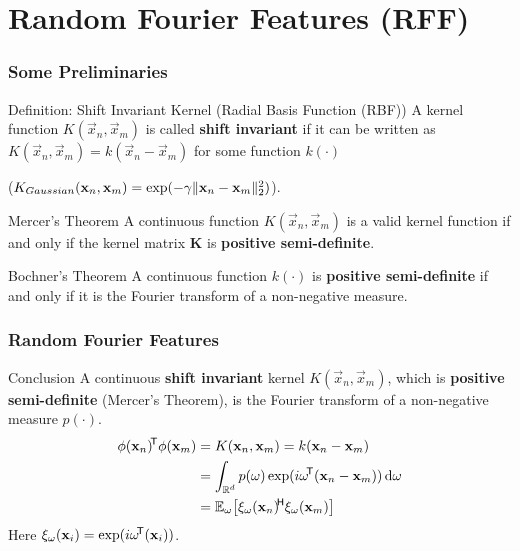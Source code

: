 \documentclass[10pt]{../Formats/RU}
\begin{document}
\section{Random Fourier Features (RFF)}
\begin{frame}
\frametitle{Some Preliminaries}
\begin{block}{Definition: Shift Invariant Kernel (Radial Basis Function (RBF))}
  A kernel function $K(\vec{x}_n, \vec{x}_m)$ is called \textbf{shift invariant} if it can be written as $K(\vec{x}_n, \vec{x}_m) = k(\vec{x}_n-\vec{x}_m)$ for some function $k(\cdot)$

  (\eg $K_{Gaussian}(\mathbf{x}_n,\mathbf{x}_m)=\exp(-\gamma\lVert\mathbf{x}_n-\mathbf{x}_m\rVert_2^2)$).
\end{block}
\begin{alertblock}{Mercer’s Theorem}
  A continuous function $K(\vec{x}_n, \vec{x}_m)$ is a valid kernel function if and only if the kernel matrix $\mathbf{K}$ is \textbf{positive semi-definite}.
\end{alertblock}
\begin{alertblock}{Bochner's Theorem}
  A continuous function $k(\cdot)$ is \textbf{positive semi-definite} if and only if it is the Fourier transform of a non-negative measure.
\end{alertblock}
\end{frame}
\begin{frame}
  \frametitle{Random Fourier Features}
  \begin{exampleblock}{Conclusion}
    A continuous \textbf{shift invariant} kernel $K(\vec{x}_n, \vec{x}_m)$, which is \textbf{positive semi-definite} (Mercer's Theorem), is the Fourier transform of a non-negative measure $p(\cdot)$.
    \begin{align}
      \phi(\vec{x}_n)\trn\phi(\vec{x}_m)
      &= K(\vec{x}_n, \vec{x}_m) = k(\vec{x}_n-\vec{x}_m) \\
      &=\int_{\R^d}p(\vec{\omega})\exp(i\vec{\omega}\trn(\vec{x}_n-\vec{x}_m))\diff\vec{\omega} \\
      &= \mathbb{E}_{\vec{\omega}}\bracks*{\xi_{\vec{\omega}}(\vec{x}_n)\coj\xi_{\vec{\omega}}(\vec{x}_m)}\label{rffinC}
    \end{align}
    Here
    $
    \xi_{\mathbf{\omega}}(\mathbf{x}_i)=\exp(i\mathbf{\omega}\!^{\mathsf{T}}(\mathbf{x}_i))
    $.
  \end{exampleblock}
\end{frame}
\end{document}
